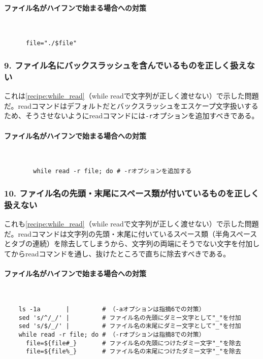 \paragraph{ファイル名がハイフンで始まる場合への対策} 　\\
\begin{frameboxit}{160.0mm}
\begin{verbatim}
	  file="./$file"
\end{verbatim}
\end{frameboxit}

\subsubsection*{9. ファイル名にバックスラッシュを含んでいるものを正しく扱えない}

これは\ref{recipe:while_read}（while readで文字列が正しく渡せない）で示した問題だ。readコマンドはデフォルトだとバックスラッシュをエスケープ文字扱いするため、そうさせないようにreadコマンドには\verb|-r|オプションを追加すべきである。

\paragraph{ファイル名がハイフンで始まる場合への対策} 　\\
\begin{frameboxit}{160.0mm}
\begin{verbatim}
		while read -r file; do # -rオプションを追加する
\end{verbatim}
\end{frameboxit}

\subsubsection*{10. ファイル名の先頭・末尾にスペース類が付いているものを正しく扱えない}

これも\ref{recipe:while_read}（while readで文字列が正しく渡せない）で示した問題だ。readコマンドは文字列の先頭・末尾に付いているスペース類（半角スペースとタブの連続）を除去してしまうから、文字列の両端にそうでない文字を付加してからreadコマンドを通し、抜けたところで直ちに除去すべきである。

\paragraph{ファイル名がハイフンで始まる場合への対策} 　\\
\begin{frameboxit}{160.0mm}
\begin{verbatim}
	ls -1a       |         # （-aオプションは指摘6での対策）
	sed 's/^/_/' |         # ファイル名の先頭にダミー文字として"_"を付加
	sed 's/$/_/' |         # ファイル名の末尾にダミー文字として"_"を付加
	while read -r file; do # （-rオプションは指摘8での対策）
	  file=${file#_}       # ファイル名の先頭につけたダミー文字"_"を除去
	  file=${file%_}       # ファイル名の末尾につけたダミー文字"_"を除去
\end{verbatim}
\end{frameboxit}

